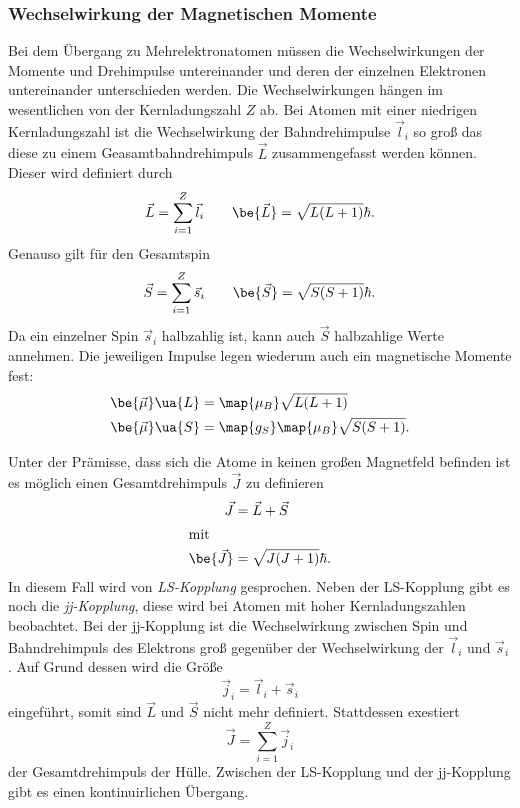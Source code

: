 \subsubsection{Wechselwirkung der Magnetischen Momente}

Bei dem Übergang zu Mehrelektronatomen müssen die Wechselwirkungen der Momente und Drehimpulse untereinander und
deren der einzelnen Elektronen untereinander unterschieden werden. Die Wechselwirkungen hängen im wesentlichen
von der Kernladungszahl $Z$ ab.
Bei Atomen mit einer niedrigen Kernladungszahl ist die Wechselwirkung der Bahndrehimpulse $\vec{l}_i$ so groß das diese zu einem
Geasamtbahndrehimpuls $\vec{L}$ zusammengefasst werden können. Dieser wird definiert durch
\begin{equation*}
  \vec{L}=\sum_{i=1}^{Z} \vec{l}_i \qquad \be{\vec{L}}=\sqrt{L(L+1)}\hbar.
\end{equation*}
Genauso gilt für den Gesamtspin
\begin{equation*}
  \vec{S}=\sum_{i=1}^{Z} \vec{s}_i \qquad \be{\vec{S}}=\sqrt{S(S+1)}\hbar.
\end{equation*}
Da ein einzelner Spin $\vec{s}_i$ halbzahlig ist, kann auch $\vec{S}$ halbzahlige Werte annehmen.
Die jeweiligen Impulse legen wiederum auch ein magnetische Momente fest:
\begin{align*}
  \be{\vec{\mu}}\ua{L}&=\map{\mu_B}\sqrt{L(L+1)}\\
  \be{\vec{\mu}}\ua{S}&=\map{g_S}\map{\mu_B}\sqrt{S(S+1)}.
\end{align*}

Unter der Prämisse, dass sich die Atome in keinen großen Magnetfeld befinden ist es möglich einen Gesamtdrehimpuls $\vec{J}$ zu
definieren
\begin{align*}
  \vec{J}&=\vec{L}+\vec{S}\\
\shortintertext{mit}
\be{\vec{J}}&=\sqrt{J(J+1)}\hbar.
\end{align*}
In diesem Fall wird von \emph{LS-Kopplung} gesprochen.
Neben der LS-Kopplung gibt es noch die \emph{jj-Kopplung}, diese wird bei Atomen mit hoher Kernladungszahlen beobachtet.
Bei der jj-Kopplung ist die Wechselwirkung zwischen Spin und Bahndrehimpuls des Elektrons groß gegenüber der Wechselwirkung der $\vec{l}_i$ und
$\vec{s}_i$. Auf Grund dessen wird die Größe
\begin{equation*}
  \vec{j}_i=  \vec{l}_i+  \vec{s}_i
\end{equation*}
eingeführt, somit sind $\vec{L}$ und $\vec{S}$ nicht mehr definiert.
Stattdessen exestiert
\begin{equation*}
  \vec{J}=\sum_{i=1}^{Z} \vec{j}_i
\end{equation*}
der Gesamtdrehimpuls der Hülle.
Zwischen der LS-Kopplung und der jj-Kopplung gibt es einen kontinuirlichen Übergang.

